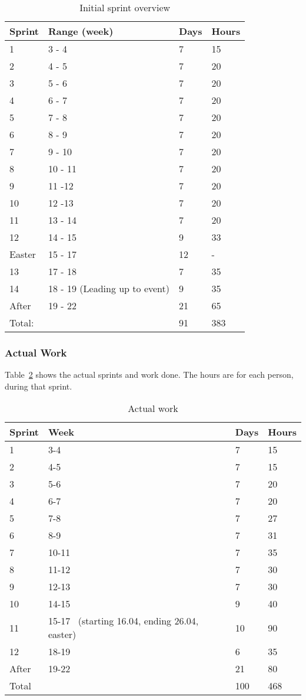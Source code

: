 \begin{longtable}{|l|l|l|l|}
\caption{Initial sprint overview} \label{table:sprintoverview} \\
\hline
 Sprint & Range (week) & Days &
 Hours\\\hline
 1 & 3 - 4 & 7 & 15\\\hline
 2 & 4 - 5 & 7 & 20\\\hline
 3 & 5 - 6 & 7 & 20 \\\hline
 4 & 6 - 7 & 7 & 20 \\\hline
 5 & 7 - 8 & 7 & 20\\\hline
 6 & 8 - 9 & 7 & 20\\\hline
 7 & 9 - 10 & 7 & 20\\\hline
 8 & 10 - 11 & 7 & 20\\\hline
 9 & 11 -12 & 7 & 20\\\hline
 10 & 12 -13 & 7 & 20\\\hline
 11 & 13 - 14 & 7 & 20\\\hline
 12 & 14 - 15 & 9 & 33\\\hline
 Easter & 15 - 17 & 12 & {}-\\\hline
 13 & 17 - 18 & 7 & 35\\\hline
 14 & 18 - 19 (Leading up to event) & 9 & 35\\\hline
 After & 19 - 22 & 21 & 65\\\hline
 Total: & & 91 & 383\\\hline
\end{longtable}


\pagebreak
\subsubsection{Actual Work}
Table~\ref{table:actualWork} shows the actual sprints and work done. The hours
are for each person, during that sprint.
\begin{longtable}{|l|l|l|l|}
\caption{Actual work} \label{table:actualWork} \\
\hline
 Sprint & Week & Days & Hours \\\hline
 1 & 3-4 & 7 & 15\\\hline
 2 & 4-5  & 7  & 15\\\hline
 3 & 5-6 & 7  & 20\\\hline
 4 & 6-7 & 7 & 20\\\hline
 5 & 7-8 & 7 & 27\\\hline
 6 & 8-9  & 7  & 31\\\hline
 7 & 10-11 & 7  & 35\\\hline
 8 & 11-12 & 7 & 30\\\hline
 9 & 12-13 & 7  & 30\\\hline
 10 & 14-15 & 9 & 40\\\hline
 11 & 15-17 \ (starting 16.04, ending 26.04, easter) & 10 & 90\\\hline
 12 & 18-19 & 6 & 35\\\hline
 After & 19-22 & 21 & 80\\\hline
 Total & & 100 & 468\\\hline
\end{longtable}
